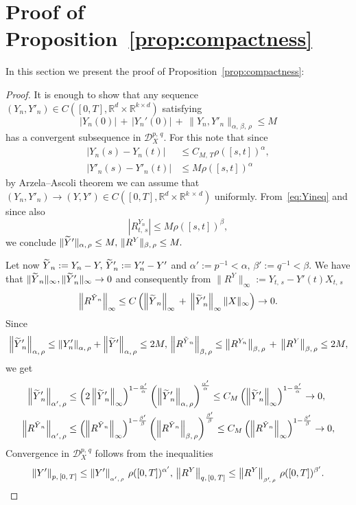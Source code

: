 \documentclass[10pt]{amsart}
\theoremstyle{definition}\newtheorem{defi}[theo]{Definition}\newtheorem{rema}[theo]{Remark}\newtheorem{exam}[theo]{Example}\newtheorem{exem}[theo]{Example}\newtheorem{nota}[theo]{Notation}
\newcommand{\scrD}{\mathscr{D}}
\newcommand{\Rr}{{\mathbb{R}}}
\let\oldtilde\tilde
\renewcommand*{\tilde}[1]{\mathchoice{\widetilde{#1}}{\widetilde{#1}}{\oldtilde{#1}}{\oldtilde{#1}}}
\begin{document}
\appendix
\section{Proof of Proposition~\ref{prop:compactness}}
In this section we present the proof of Proposition~\ref{prop:compactness}:
\begin{proof}
It is enough to show that any sequence $(Y_n, Y'_n)\in C([0,T], \Rr^d\times \Rr^{k\times d})$ satisfying
\[
\left|Y_n(0)\right|\,+\,\big|Y_n'(0)\big|\,+\,\big\|Y_n, Y'_n\big\|_{\alpha,\,\beta,\,\rho}\leq M
\]
has a convergent subsequence in $\scrD^{p,\,q}_{X}.$ For this note that since
\begin{equation}\label{eq:Yineq}
\begin{split}
\left|Y_n(s)-Y_n(t)\right|&\leq C_{M,\,T}\rho([s,t])^{\alpha},\\
\big|Y'_n(s)-Y'_n(t)\big|&\leq M\rho([s,t])^{\alpha} 
\end{split}
\end{equation}
by Arzela--Ascoli theorem we can assume that $(Y_n, Y'_n)\to (Y, Y')\in C([0,T], \Rr^d\times \Rr^{k\,\times\,d})$ uniformly. From~\eqref{eq:Yineq} and since also
\begin{equation}\label{eq:RYineq}
\left|R^{Y_n}_{t,\,s}\right|\leq M\rho([s,t])^{\beta},
\end{equation}
we conclude $\|\tilde{Y}'\|_{\alpha,\,\rho}\leq M,\, \|R^{{Y}}\|_{\beta,\,\rho}\leq M.$

Let now $\tilde{Y}_n:=Y_n-Y,\, \tilde{Y}'_n:=Y'_n-Y'$ and $\alpha':=p^{-1}<\alpha,\, \beta':=q^{-1}<\beta$. We have that $\|\tilde{Y}_n\|_{\infty}, \|\tilde{Y}_n'\|_{\infty}\to 0$ and consequently from $\|R^{{Y}}\|_{\infty}:=Y_{t,\,s}-Y'(t)X_{t,\,s}$
\[
\left\|R^{\tilde{Y}_n}\right\|_{\infty}\leq C\left(\left\|\tilde{Y}_n\right\|_{\infty}\,+\,\left\|\tilde{Y}'_n\right\|_{\infty}\|X\|_{\infty}\right)\to 0.
\]
Since
\[
\left\|\tilde{Y}_n'\right\|_{\alpha,\,\rho}\leq \left\|Y_n'\right\|_{\alpha,\,\rho}+\left\|\tilde{Y}'\right\|_{\alpha,\,\rho}\leq 2 M,\, \left\|R^{\tilde{Y}_n}\right\|_{\beta,\,\rho}\leq \left\|R^{{Y}_n}\right\|_{\beta,\,\rho}\,+\,\left\|R^{{Y}}\right\|_{\beta,\,\rho}\leq 2 M,
\]
we get
\begin{align*}
\left\|\tilde{Y}_n'\right\|_{\alpha',\,\rho}&\leq\left(2 \left\|\tilde{Y}_n'\right\|_{\infty}\right)^{1-\frac{\alpha'}{\alpha}} \left(\left\|\tilde{Y}_n'\right\|_{\alpha,\,\rho}\right)^{\frac{\alpha'}{\alpha}}\leq C_M \left(\left\|\tilde{Y}_n'\right\|_{\infty}\right)^{1-\frac{\alpha'}{\alpha}}\to 0,
\\
\left\|R^{\tilde{Y}_n}\right\|_{\alpha',\, \rho}&\leq\left(\left\|R^{\tilde{Y}_n}\right\|_{\infty}\right)^{1-\frac{\beta'}{\beta}} \left(\left\|R^{\tilde{Y}_n}\right\|_{\beta,\,\rho}\right)^{\frac{\beta'}{\beta}}\leq C_M\left(\left\|R^{\tilde{Y}_n}\right\|_{\infty}\right)^{1-\frac{\beta'}{\beta}}\to 0,
\end{align*}
Convergence in $\scrD^{p,\,q}_{X}$ follows from the inequalities
\[
\left\|Y'\right\|_{p,\,[0,\,T]}\leq \left\|Y'\right\|_{_{\alpha',\,\rho}}\, \rho([0,T])^{\alpha'},\, \left\|R^Y\right\|_{q,\, [0,\,T]}\leq \left\|R^Y\right\|_{_{\beta'\!,\,\rho}}\, \rho([0,T])^{\beta'}.\qedhere
\]
\end{proof}
\end{document}
